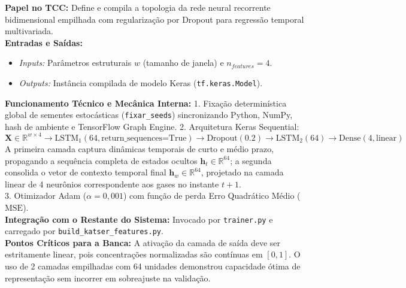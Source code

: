 \documentclass[10pt,a4paper]{article}
\begin{document}
\begin{filebox}
\textbf{Papel no TCC:} Define e compila a topologia da rede neural recorrente bidimensional empilhada com regularização por Dropout para regressão temporal multivariada.\\
\textbf{Entradas e Saídas:}
\begin{itemize}[leftmargin=*,itemsep=1pt]
  \item \textit{Inputs:} Parâmetros estruturais $w$ (tamanho de janela) e $n_{features}=4$.
  \item \textit{Outputs:} Instância compilada de modelo Keras (\texttt{tf.keras.Model}).
\end{itemize}
\textbf{Funcionamento Técnico e Mecânica Interna:} 
1. Fixação determinística global de sementes estocásticas (\texttt{fixar\_seeds}) sincronizando Python, NumPy, hash de ambiente e TensorFlow Graph Engine.
2. Arquitetura Keras Sequential:
   $$\mathbf{X} \in \mathbb{R}^{w \times 4} \longrightarrow \text{LSTM}_1(64, \text{return\_sequences=True}) \longrightarrow \text{Dropout}(0.2) \longrightarrow \text{LSTM}_2(64) \longrightarrow \text{Dense}(4, \text{linear})$$
   A primeira camada captura dinâmicas temporais de curto e médio prazo, propagando a sequência completa de estados ocultos $\mathbf{h}_t \in \mathbb{R}^{64}$; a segunda consolida o vetor de contexto temporal final $\mathbf{h}_w \in \mathbb{R}^{64}$, projetado na camada linear de 4 neurônios correspondente aos gases no instante $t+1$.\\
3. Otimizador Adam ($\alpha = 0,001$) com função de perda Erro Quadrático Médio ($\text{MSE}$).\\
\textbf{Integração com o Restante do Sistema:} Invocado por \texttt{trainer.py} e carregado por \texttt{build\_katser\_features.py}.\\
\textbf{Pontos Críticos para a Banca:} A ativação da camada de saída deve ser estritamente linear, pois concentrações normalizadas são contínuas em $[0, 1]$. O uso de 2 camadas empilhadas com 64 unidades demonstrou capacidade ótima de representação sem incorrer em sobreajuste na validação.
\end{filebox}
\end{document}
